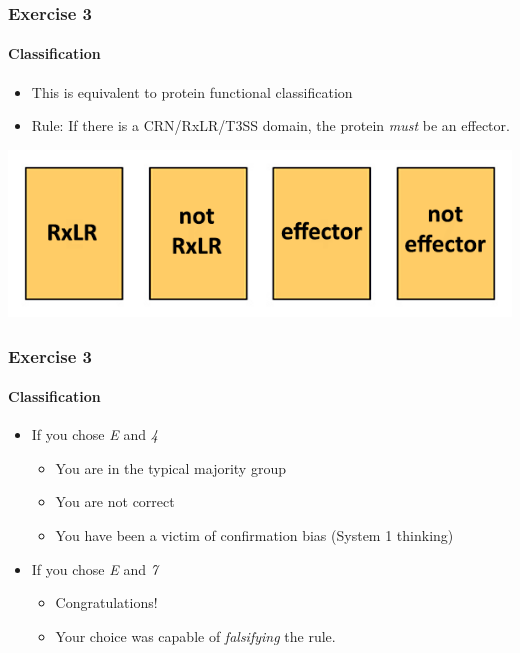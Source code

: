\documentclass[table]{beamer}
\begin{document}
  \begin{frame}
    \frametitle{Exercise 3}
    \framesubtitle{Classification}
    \begin{itemize}
      \item This is equivalent to protein functional classification
      \item Rule: If there is a CRN/RxLR/T3SS domain, the protein \textit{must} be an effector.
    \end{itemize}
    \includegraphics[width=\textwidth]{images/wason_rxlr}
  \end{frame}

  \begin{frame}
    \frametitle{Exercise 3}
    \framesubtitle{Classification}
    \begin{itemize}
      \item<1-> If you chose \emph{E} and \emph{4}
      \begin{itemize}
        \item<2-> You are in the typical majority group
        \item<3-> You are not correct
        \item<4-> You have been a victim of confirmation bias (System 1 thinking)
      \end{itemize}
      \item<5-> If you chose \emph{E} and \emph{7}
      \begin{itemize}
        \item<6-> Congratulations!
        \item<6-> Your choice was capable of \textit{falsifying} the rule.
      \end{itemize}
    \end{itemize}
  \end{frame}
\end{document}
